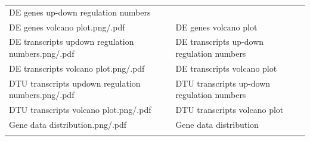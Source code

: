 \documentclass[]{article}
\begin{document}
\begin{longtable}[]{@{}ll@{}}
\begin{minipage}[t]{0.43\columnwidth}
DE genes up-down regulation numbers\strut
\end{minipage}\tabularnewline
\begin{minipage}[t]{0.51\columnwidth}\raggedright\strut
DE genes volcano plot.png/.pdf\strut
\end{minipage} & \begin{minipage}[t]{0.43\columnwidth}\raggedright\strut
DE genes volcano plot\strut
\end{minipage}\tabularnewline
\begin{minipage}[t]{0.51\columnwidth}\raggedright\strut
DE transcripts updown regulation numbers.png/.pdf\strut
\end{minipage} & \begin{minipage}[t]{0.43\columnwidth}\raggedright\strut
DE transcripts up-down regulation numbers\strut
\end{minipage}\tabularnewline
\begin{minipage}[t]{0.51\columnwidth}\raggedright\strut
DE transcripts volcano plot.png/.pdf\strut
\end{minipage} & \begin{minipage}[t]{0.43\columnwidth}\raggedright\strut
DE transcripts volcano plot\strut
\end{minipage}\tabularnewline
\begin{minipage}[t]{0.51\columnwidth}\raggedright\strut
DTU transcripts updown regulation numbers.png/.pdf\strut
\end{minipage} & \begin{minipage}[t]{0.43\columnwidth}\raggedright\strut
DTU transcripts up-down regulation numbers\strut
\end{minipage}\tabularnewline
\begin{minipage}[t]{0.51\columnwidth}\raggedright\strut
DTU transcripts volcano plot.png/.pdf\strut
\end{minipage} & \begin{minipage}[t]{0.43\columnwidth}\raggedright\strut
DTU transcripts volcano plot\strut
\end{minipage}\tabularnewline
\begin{minipage}[t]{0.51\columnwidth}\raggedright\strut
Gene data distribution.png/.pdf\strut
\end{minipage} & \begin{minipage}[t]{0.43\columnwidth}\raggedright\strut
Gene data distribution\strut
\end{minipage}\tabularnewline
\begin{minipage}[t]{0.51\columnwidth}\raggedright\strut

\end{minipage}
\end{longtable}
\end{document}
